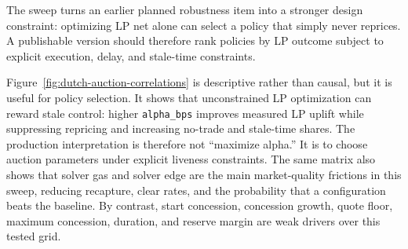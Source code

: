 \documentclass[11pt]{article}
\begin{document}
\begin{table}[t]
\centering
\tiny
{}
\caption{Robustness sweep summary. The LP-only optimum is a degenerate no-trade/stale policy, so execution-constrained selection is the relevant design objective. Across the 1,024 configurations, 416 were classified better, 608 neutral, and 0 worse under the exploratory bootstrap rule.}
\label{tab:robustness}
\end{table}

The sweep turns an earlier planned robustness item into a stronger design constraint: optimizing LP net alone can select a policy that simply never reprices. A publishable version should therefore rank policies by LP outcome subject to explicit execution, delay, and stale-time constraints.

Figure~\ref{fig:dutch-auction-correlations} is descriptive rather than causal, but it is useful for policy selection. It shows that unconstrained LP optimization can reward stale control: higher \texttt{alpha\_bps} improves measured LP uplift while suppressing repricing and increasing no-trade and stale-time shares. The production interpretation is therefore not ``maximize alpha.'' It is to choose auction parameters under explicit liveness constraints. The same matrix also shows that solver gas and solver edge are the main market-quality frictions in this sweep, reducing recapture, clear rates, and the probability that a configuration beats the baseline. By contrast, start concession, concession growth, quote floor, maximum concession, duration, and reserve margin are weak drivers over this tested grid.
\end{document}

